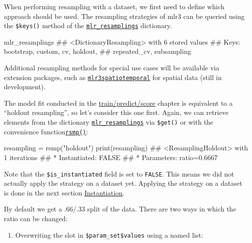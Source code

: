 \documentclass[]{article}
\newenvironment{Shaded}{}{}
\newcommand{\KeywordTok}[1]{\textcolor[rgb]{0.00,0.00,1.00}{#1}}
\newcommand{\NormalTok}[1]{#1}
\newcommand{\StringTok}[1]{\textcolor[rgb]{0.00,0.50,0.50}{#1}}
\providecommand{\tightlist}{%
  \setlength{\itemsep}{0pt}\setlength{\parskip}{0pt}}
\renewenvironment{Shaded} {\begin{snugshade}\small} {\end{snugshade}}
\begin{document}
When performing resampling with a dataset, we first need to define which approach should be used.
The resampling strategies of mlr3 can be queried using the \texttt{\$keys()} method of the \href{https://mlr3.mlr-org.com/reference/mlr_resamplings.html}{\texttt{mlr\_resamplings}} dictionary.

\begin{Shaded}
\begin{Highlighting}[]
\NormalTok{mlr_resamplings}
\NormalTok{## <DictionaryResampling> with 6 stored values}
\NormalTok{## Keys: bootstrap, custom, cv, holdout,}
\NormalTok{##   repeated_cv, subsampling}
\end{Highlighting}
\end{Shaded}

Additional resampling methods for special use cases will be available via extension packages, such as \href{https://github.com/mlr-org/mlr3spatiotemporal}{\texttt{mlr3spatiotemporal}} for spatial data (still in development).

The model fit conducted in the \protect\hyperlink{train-predict}{train/predict/score} chapter is equivalent to a ``holdout resampling'', so let's consider this one first.
Again, we can retrieve elements from the dictionary \href{https://mlr3.mlr-org.com/reference/mlr_resamplings.html}{\texttt{mlr\_resamplings}} via \texttt{\$get()} or with the convenience function\href{https://mlr3.mlr-org.com/reference/mlr_sugar.html}{\texttt{rsmp()}}:

\begin{Shaded}
\begin{Highlighting}[]
\NormalTok{resampling =}\StringTok{ }\KeywordTok{rsmp}\NormalTok{(}\StringTok{"holdout"}\NormalTok{)}
\KeywordTok{print}\NormalTok{(resampling)}
\NormalTok{## <ResamplingHoldout> with 1 iterations}
\NormalTok{## * Instantiated: FALSE}
\NormalTok{## * Parameters: ratio=0.6667}
\end{Highlighting}
\end{Shaded}

Note that the \texttt{\$is\_instantiated} field is set to \texttt{FALSE}.
This means we did not actually apply the strategy on a dataset yet.
Applying the strategy on a dataset is done in the next section \protect\hyperlink{instantiation}{Instantiation}.

By default we get a .66/.33 split of the data.
There are two ways in which the ratio can be changed:

\begin{enumerate}
\def\labelenumi{\arabic{enumi}.}
\tightlist
\item
  Overwriting the slot in \texttt{\$param\_set\$values} using a named list:
\end{enumerate}
\end{document}
